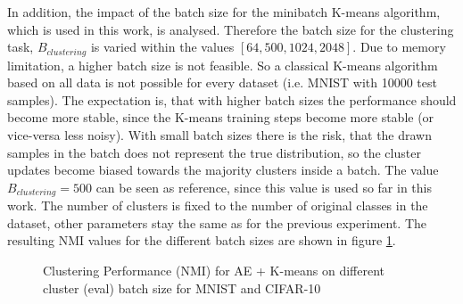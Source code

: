 \documentclass[12pt,DIV14,BCOR12mm,a4paper,footexclude,headinclude,halfparskip-,twoside,openright,cleardoubleempty,idxtotoc,bibtotoc,listtotoc,abstracton]{scrreprt} %
\numberwithin{equation}{chapter}
\begin{document}
In addition, the impact of the batch size for the minibatch K-means algorithm, which is used in this work, is analysed. Therefore the batch size for the clustering task, $B_{clustering}$ is varied within the values $[64, 500, 1024, 2048]$. Due to memory limitation, a higher batch size is not feasible. So a classical K-means algorithm based on all data is not possible for every dataset (i.e. MNIST with 10000 test samples). The expectation is, that with higher batch sizes the performance should become more stable, since the K-means training steps become more stable (or vice-versa less noisy). With small batch sizes there is the risk, that the drawn samples in the batch does not represent the true distribution, so the cluster updates become biased towards the majority clusters inside a batch. The value $B_{clustering}=500$ can be seen as reference, since this value is used so far in this work. The number of clusters is fixed to the number of original classes in the dataset, other parameters stay the same as for the previous experiment. The resulting NMI values for the different batch sizes are shown in figure \ref{fig:ClusterPerformance_NMI_kmeans_eval_batch_size}.
	 \begin{figure}[htb!]
		\centering
		\qquad
		\caption{Clustering Performance (NMI) for AE + K-means on different cluster (eval) batch size for MNIST and CIFAR-10}
		\label{fig:ClusterPerformance_NMI_kmeans_eval_batch_size}
	\end{figure}
\end{document}
